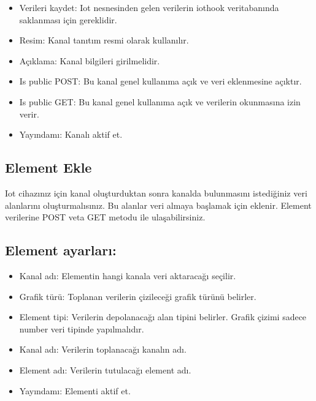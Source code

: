 \documentclass[letterpaper,10pt,turkish]{sphinxmanual}
\begin{document}
\begin{itemize}
\item {} 
Verileri kaydet: Iot nesnesinden gelen verilerin iothook veritabanında saklanması için gereklidir.

\item {} 
Resim: Kanal tanıtım resmi olarak kullanılır.

\item {} 
Açıklama: Kanal bilgileri girilmelidir.

\item {} 
Is public POST: Bu kanal genel kullanıma açık ve veri eklenmesine açıktır.

\item {} 
Is public GET: Bu kanal genel kullanıma açık ve verilerin okunmasına izin verir.

\item {} 
Yayındamı: Kanalı aktif et.

\end{itemize}


\subsection{Element Ekle}
\label{\detokenize{create-new-channel:element-ekle}}
Iot cihazınız için kanal oluşturduktan sonra kanalda bulunmasını istediğiniz
veri alanlarını oluşturmalısınız. Bu alanlar veri almaya başlamak
için eklenir. Element verilerine POST veta GET metodu ile ulaşabilirsiniz.


\subsection{Element ayarları:}
\label{\detokenize{create-new-channel:element-ayarlari}}\begin{itemize}
\item {} 
Kanal adı: Elementin hangi kanala veri aktaracağı seçilir.

\item {} 
Grafik türü: Toplanan verilerin çizileceği grafik türünü belirler.

\item {} 
Element tipi: Verilerin depolanacağı alan tipini belirler. Grafik çizimi sadece \sphinxquotedblleft{}number\sphinxquotedblright{} veri tipinde yapılmalıdır.

\item {} 
Kanal adı: Verilerin toplanacağı kanalın adı.

\item {} 
Element adı: Verilerin tutulacağı element adı.

\item {} 
Yayındamı: Elementi aktif et.

\end{itemize}
\end{document}
